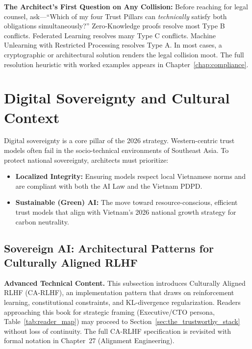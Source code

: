 \begin{svgraybox}
\textbf{The Architect's First Question on Any Collision:} Before reaching for legal counsel, ask---``Which of my four Trust Pillars can \emph{technically} satisfy both obligations simultaneously?'' Zero-Knowledge proofs resolve most Type B conflicts. Federated Learning resolves many Type C conflicts. Machine Unlearning with Restricted Processing resolves Type A. In most cases, a cryptographic or architectural solution renders the legal collision moot. The full resolution heuristic with worked examples appears in Chapter~\ref{chap:compliance}.
\end{svgraybox}

\section{Digital Sovereignty and Cultural Context}
\label{sec:digital_sovereignty}

Digital sovereignty is a core pillar of the 2026 strategy. Western-centric trust models often fail in the socio-technical environments of Southeast Asia. To protect national sovereignty, architects must prioritize:
\begin{itemize}
    \item \textbf{Localized Integrity:} Ensuring models respect local Vietnamese norms and are compliant with both the AI Law and the Vietnam PDPD.
    \item \textbf{Sustainable (Green) AI:} The move toward resource-conscious, efficient trust models that align with Vietnam's 2026 national growth strategy for carbon neutrality.
\end{itemize}

\subsection{Sovereign AI: Architectural Patterns for Culturally
            Aligned RLHF}
\label{subsec:sovereign-ai-rlhf}

\begin{svgraybox}
\textbf{Advanced Technical Content.} This subsection introduces Culturally Aligned RLHF (CA-RLHF), an implementation pattern that draws on reinforcement learning, constitutional constraints, and KL-divergence regularization. Readers approaching this book for strategic framing (Executive/CTO persona, Table~\ref{tab:reader_map}) may proceed to Section~\ref{sec:the_trustworthy_stack} without loss of continuity. The full CA-RLHF specification is revisited with formal notation in Chapter~27 (Alignment Engineering).
\end{svgraybox}

